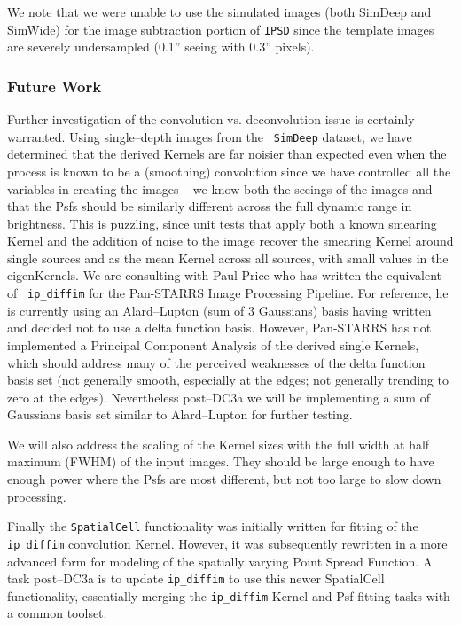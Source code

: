 We note that we were unable to use the simulated images (both SimDeep
and SimWide) for the image subtraction portion of {\tt IPSD} since the
template images are severely undersampled (0.1'' seeing with 0.3''
pixels).

\subsubsection{Future Work}

Further investigation of the convolution vs. deconvolution issue is
certainly warranted.  Using single--depth images from the {\tt
SimDeep} dataset, we have determined that the derived Kernels are far
noisier than expected even when the process is known to be a
(smoothing) convolution since we have controlled all the variables in
creating the images -- we know both the seeings of the images and that
the Psfs should be similarly different across the full dynamic range
in brightness.  This is puzzling, since unit tests that apply both a
known smearing Kernel and the addition of noise to the image recover
the smearing Kernel around single sources and as the mean Kernel
across all sources, with small values in the eigenKernels.  We are
consulting with Paul Price who has written the equivalent of {\tt
ip\_diffim} for the Pan-STARRS Image Processing Pipeline.  For
reference, he is currently using an Alard--Lupton (sum of 3 Gaussians)
basis having written and decided not to use a delta function basis.
However, Pan-STARRS has not implemented a Principal Component Analysis
of the derived single Kernels, which should address many of the
perceived weaknesses of the delta function basis set (not generally
smooth, especially at the edges; not generally trending to zero at the
edges).  Nevertheless post--DC3a we will be implementing a sum of
Gaussians basis set similar to Alard--Lupton for further testing.

We will also address the scaling of the Kernel sizes with the full
width at half maximum (FWHM) of the input images.  They should be
large enough to have enough power where the Psfs are most different,
but not too large to slow down processing.

Finally the {\tt SpatialCell} functionality was initially written for
fitting of the {\tt ip\_diffim} convolution Kernel.  However, it was
subsequently rewritten in a more advanced form for modeling of the
spatially varying Point Spread Function.  A task post--DC3a is to
update {\tt ip\_diffim} to use this newer SpatialCell functionality,
essentially merging the {\tt ip\_diffim} Kernel and Psf fitting tasks
with a common toolset.
